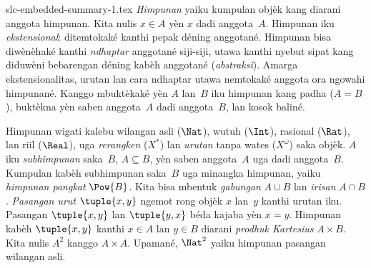 \begin{filecontents*}[overwrite]{slc-embedded-summary-1.tex}
\emph{Himpunan} yaiku kumpulan objèk kang diarani anggota himpunan.
Kita nulis $x \in A$ yèn $x$ dadi anggota~$A$. Himpunan iku
\emph{ekstensional}: ditemtokaké kanthi pepak déning anggotané.
Himpunan bisa diwènèhaké kanthi \emph{ndhaptar} anggotané siji-siji,
utawa kanthi nyebut sipat kang diduwèni bebarengan déning kabèh
anggotané (\emph{abstraksi}). Amarga ekstensionalitas, urutan lan
cara ndhaptar utawa nemtokaké anggota ora ngowahi himpunané.
Kanggo mbuktèkaké yèn $A$ lan~$B$ iku himpunan kang padha ($A=B$),
buktèkna yèn saben anggota~$A$ dadi anggota~$B$, lan kosok baliné.

Himpunan wigati kalebu wilangan asli ($\Nat$), wutuh ($\Int$),
rasional ($\Rat$), lan riil ($\Real$), uga \emph{rerangken}
($X^*$) lan \emph{urutan} tanpa wates ($X^\omega$) saka objèk.
$A$ iku \emph{subhimpunan} saka~$B$, $A\subseteq B$, yèn saben
anggota~$A$ uga dadi anggota~$B$. Kumpulan kabèh subhimpunan
saka~$B$ uga minangka himpunan, yaiku \emph{himpunan pangkat}
$\Pow{B}$. Kita bisa mbentuk \emph{gabungan} $A\cup B$ lan
\emph{irisan} $A\cap B$. \emph{Pasangan urut} $\tuple{x,y}$
ngemot rong objèk $x$ lan~$y$ kanthi urutan iku. Pasangan
$\tuple{x,y}$ lan $\tuple{y,x}$ béda kajaba yèn $x=y$.
Himpunan kabèh $\tuple{x,y}$ kanthi $x\in A$ lan $y\in B$
diarani \emph{prodhuk Kartesius} $A\times B$. Kita nulis $A^2$
kanggo $A\times A$. Upamané, $\Nat^2$ yaiku himpunan pasangan
wilangan asli.
\end{filecontents*}

